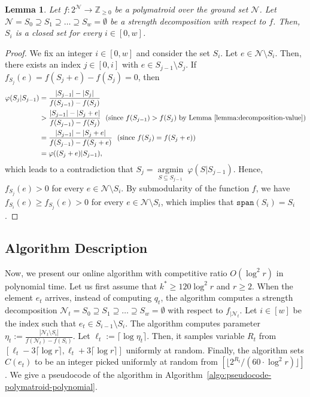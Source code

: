 \documentclass[11pt]{article}
\newtheorem{lemma}{Lemma}
\theoremstyle{definition}
\newcommand{\calN}{{\mathcal{N}}}
\begin{document}
\begin{lemma}\label{lemma:decomposition-closed-set}
    Let $f:2^\mathcal{N}\rightarrow \mathbb{Z}_{\geq 0}$ be a polymatroid over the ground set $\mathcal{N}$. Let $\calN=S_0\supseteq S_1\supseteq \ldots \supseteq S_{w}=\emptyset$ be a strength decomposition with respect to $f$. Then, $S_i$ is a closed set for every $i\in [0,w]$.
\end{lemma}
\begin{proof}
    We fix an integer $i\in [0,w]$ and consider the set $S_i$. Let $e\in \mathcal{N}\setminus S_{i}$. Then, there exists an index $j\in [0,i]$ with $e\in S_{j-1}\setminus S_j$. If $f_{S_j}(e)=f(S_j+e)-f(S_j)=0$, then
    $$\begin{aligned}
        \varphi(S_j|S_{j-1}) &= \frac{|S_{j-1}|-|S_j|}{f(S_{j-1})-f(S_j)} \\
        &> \frac{|S_{j-1}|-|S_j+e|}{f(S_{j-1})-f(S_j)} \ \ \text{(since $f(S_{j-1})>f(S_j)$ by Lemma~\ref{lemma:decomposition-value})}\\
        &= \frac{|S_{j-1}|-|S_j+e|}{f(S_{j-1})-f(S_j+e)} \ \ \text{(since $f(S_j)=f(S_j+e)$)} \\
        &= \varphi((S_j+e)|S_{j-1}),
    \end{aligned}$$
    which leads to a contradiction that $S_j=\mathop{argmin}\limits_{S\subseteq S_{j-1}} \ \varphi(S|S_{j-1})$. Hence, $f_{S_j}(e)>0$ for every $e\in \mathcal{N}\setminus S_i$. By submodularity of the function $f$, we have $f_{S_i}(e)\geq f_{S_j}(e)>0$ for every $e\in \mathcal{N}\setminus S_i$, which implies that $\texttt{span}(S_i)=S_i$.
\end{proof}

\subsection{Algorithm Description}
Now, we present our online algorithm with competitive ratio $O(\log^2 r)$ in polynomial time. Let us first assume that $k^*\geq 120\log^2 r$ and $r\geq 2$. When the element $e_t$ arrives, instead of computing $q_t$, the algorithm computes a strength decomposition $\calN_t=S_0\supseteq S_1\supseteq \ldots \supseteq S_{w}=\emptyset$ with respect to $f_{|\mathcal{N}_t}$. Let $i\in [w]$ be the index such that $e_t\in S_{i-1}\setminus S_i$. The algorithm computes parameter $\eta_t:=\frac{|\mathcal{N}_t\setminus S_i|}{f(\mathcal{N}_t)-f(S_i)}$. Let $\ell_t:=\lceil \log \eta_t\rceil$. Then, it samples variable $R_t$ from $[\ell_t-3\lceil\log r\rceil, \ell_t+3\lceil\log r\rceil]$ uniformly at random. Finally, the algorithm sets $C(e_t)$ to be an integer picked uniformly at random from $[\lfloor 2^{R_t}/(60\cdot \log ^2 r)\rfloor]$. We give a pseudocode of the algorithm in Algorithm~\ref{algo:pseudocode-polymatroid-polynomial}.
\end{document}

